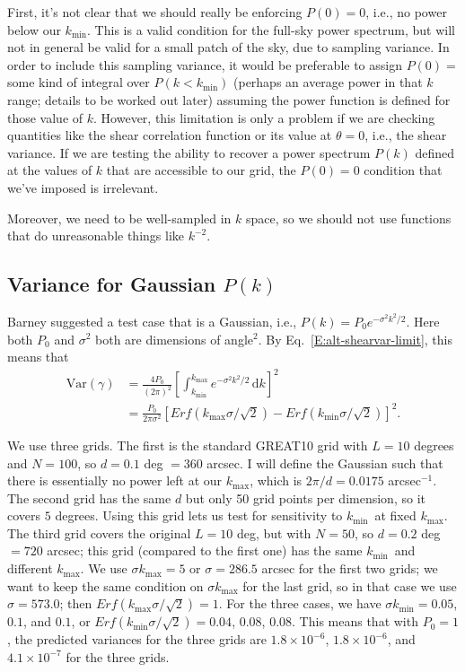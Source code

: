 \documentclass[preprint]{aastex}
\newcommand{\kmax}{\ensuremath{k_\mathrm{max}}}
\newcommand{\kmin}{\ensuremath{k_\mathrm{min}}}
\newcommand{\rmd}{\ensuremath{\mathrm{d}}}
\begin{document}
First, it's not clear that we should really be enforcing $P(0)=0$,
i.e., no power below our \kmin.
This is a valid condition for the full-sky power spectrum, but will
not in general be valid for a small patch of the sky, due to sampling
variance.  In order to include this sampling variance, it would be
preferable to assign $P(0)=$ some kind of integral over $P(k<\kmin)$
(perhaps an average power in that $k$ range; details to be worked out later) assuming the power function is
defined for those value of $k$.  However, this limitation is only a
problem if we are checking quantities like the shear correlation
function or its value at $\theta=0$, i.e., the shear variance.  If we
are testing the ability to recover a power spectrum $P(k)$ defined at
the values of $k$ that are accessible to our grid, the $P(0)=0$
condition that we've imposed is irrelevant.

Moreover, we need to be well-sampled in $k$ space, so we should not
use functions that do unreasonable things like $k^{-2}$.

\subsection{Variance for Gaussian $P(k)$}

Barney suggested a test case that is a Gaussian, i.e., $P(k) =
P_0 e^{-\sigma^2 k^2 / 2}$.  Here both $P_0$ and $\sigma^2$ both
are dimensions of angle$^2$.  By Eq.~\ref{E:alt-shearvar-limit}, this means that
\begin{align}
\mathrm{Var}(\gamma) &= \frac{4P_0}{(2\pi)^2} \left[\int_{\kmin}^{\kmax} 
e^{-\sigma^2 k^2/2} \,\rmd k\right]^2 \\
 &= \frac{P_0}{2\pi\sigma^2}\left[ Erf(\kmax\sigma/\sqrt{2}) - Erf(\kmin\sigma/\sqrt{2})\right]^2.
\end{align}

We use three grids. The first is the standard GREAT10 grid with $L=10$
degrees and $N=100$, so $d=0.1$ deg $=360$ arcsec.  I will define the
Gaussian such that there is essentially no power left at our \kmax,
which is $2\pi/d=0.0175$ arcsec$^{-1}$.  The second grid has the same
$d$ but only 50 grid points per dimension, so it covers $5$ degrees.
Using this grid lets us test for sensitivity to \kmin\ at fixed \kmax.
The third grid covers the original $L=10$ deg, but with $N=50$, so
$d=0.2$ deg $=720$ arcsec; this grid (compared to the first one) has
the same \kmin\ and different \kmax. We use $\sigma \kmax=5$ or
$\sigma=286.5$ 
arcsec for the first two grids; we want to keep the same condition on
$\sigma\kmax$ for the last grid, so in that case we use
$\sigma=573.0$; then $Erf(\kmax\sigma/\sqrt{2})=1$.  For the three cases, we have $\sigma\kmin=0.05$,
$0.1$, and $0.1$, or $Erf(\kmin\sigma/\sqrt{2})=0.04$, $0.08$,
$0.08$.  This means that with $P_0=1$, the predicted variances for the
three grids are $1.8\times 10^{-6}$, $1.8\times 10^{-6}$, and
$4.1\times 10^{-7}$ for the three grids.
\end{document}
